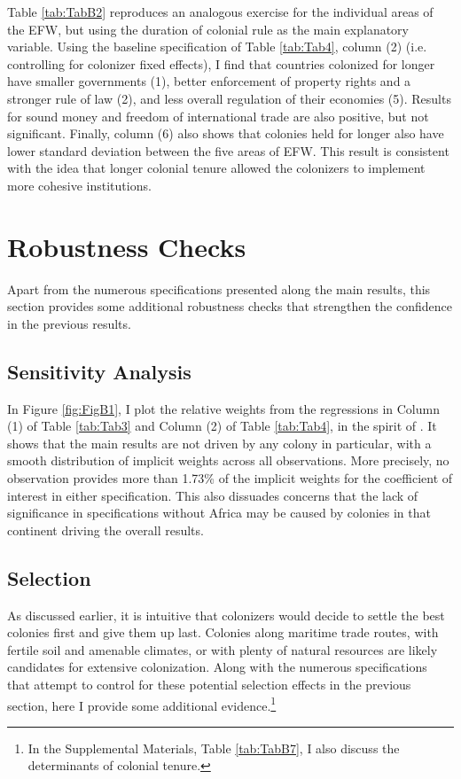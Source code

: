 \documentclass[a4paper,12pt]{article}
\begin{document}
Table \ref{tab:TabB2} reproduces an analogous exercise for the individual areas of the EFW, but using the duration of colonial rule as the main explanatory variable. Using the baseline specification of Table \ref{tab:Tab4}, column (2) (i.e. controlling for colonizer fixed effects), I find that countries colonized for longer have smaller governments (1), better enforcement of property rights and a stronger rule of law (2), and less overall regulation of their economies (5). Results for sound money and freedom of international trade are also positive, but not significant. Finally, column (6) also shows that colonies held for longer also have lower standard deviation between the five areas of EFW. This result is consistent with the idea that longer colonial tenure allowed the colonizers to implement more cohesive institutions. 


\section{Robustness Checks}

Apart from the numerous specifications presented along the main results, this section provides some additional robustness checks that strengthen the confidence in the previous results. 


\subsection{Sensitivity Analysis}\label{sensitivity}

In Figure \ref{fig:FigB1}, I plot the relative weights from the regressions in Column (1) of Table \ref{tab:Tab3} and Column (2) of Table \ref{tab:Tab4}, in the spirit of \cite{aronow2016does}. It shows that the main results are not driven by any colony in particular, with a smooth distribution of implicit weights across all observations. More precisely, no observation provides more than 1.73\% of the implicit weights for the coefficient of interest in either specification. This also dissuades concerns that the lack of significance in specifications without Africa may be caused by colonies in that continent driving the overall results.

\subsection{Selection}\label{selection}

As discussed earlier, it is intuitive that colonizers would decide to settle the best colonies first and give them up last. Colonies along maritime trade routes, with fertile soil and amenable climates, or with plenty of natural resources are likely candidates for extensive colonization. Along with the numerous specifications that attempt to control for these potential selection effects in the previous section, here I provide some additional evidence.\footnote{In the Supplemental Materials, Table \ref{tab:TabB7}, I also discuss the determinants of colonial tenure.} 
\end{document}
